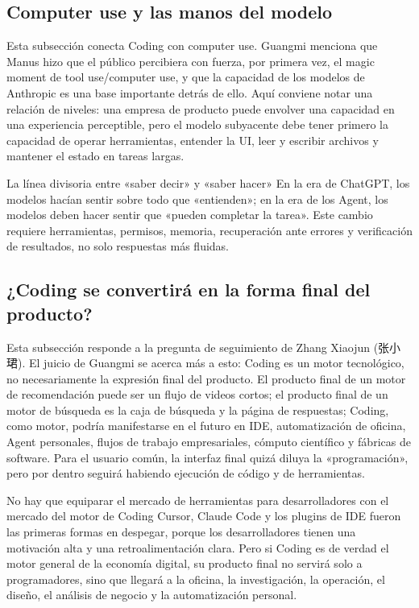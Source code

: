 \documentclass[a4paper]{article}
\begin{document}
\subsection{Computer use y las manos del modelo}

Esta subsección conecta Coding con computer use. Guangmi menciona que Manus hizo que el público percibiera con fuerza, por primera vez, el magic moment de tool use/computer use, y que la capacidad de los modelos de Anthropic es una base importante detrás de ello. Aquí conviene notar una relación de niveles: una empresa de producto puede envolver una capacidad en una experiencia perceptible, pero el modelo subyacente debe tener primero la capacidad de operar herramientas, entender la UI, leer y escribir archivos y mantener el estado en tareas largas.

\begin{importantbox}{La línea divisoria entre «saber decir» y «saber hacer»}
En la era de ChatGPT, los modelos hacían sentir sobre todo que «entienden»; en la era de los Agent, los modelos deben hacer sentir que «pueden completar la tarea». Este cambio requiere herramientas, permisos, memoria, recuperación ante errores y verificación de resultados, no solo respuestas más fluidas.
\end{importantbox}

\subsection{¿Coding se convertirá en la forma final del producto?}

Esta subsección responde a la pregunta de seguimiento de Zhang Xiaojun (张小珺). El juicio de Guangmi se acerca más a esto: Coding es un motor tecnológico, no necesariamente la expresión final del producto. El producto final de un motor de recomendación puede ser un flujo de videos cortos; el producto final de un motor de búsqueda es la caja de búsqueda y la página de respuestas; Coding, como motor, podría manifestarse en el futuro en IDE, automatización de oficina, Agent personales, flujos de trabajo empresariales, cómputo científico y fábricas de software. Para el usuario común, la interfaz final quizá diluya la «programación», pero por dentro seguirá habiendo ejecución de código y de herramientas.

\begin{warningbox}{No hay que equiparar el mercado de herramientas para desarrolladores con el mercado del motor de Coding}
Cursor, Claude Code y los plugins de IDE fueron las primeras formas en despegar, porque los desarrolladores tienen una motivación alta y una retroalimentación clara. Pero si Coding es de verdad el motor general de la economía digital, su producto final no servirá solo a programadores, sino que llegará a la oficina, la investigación, la operación, el diseño, el análisis de negocio y la automatización personal.
\end{warningbox}
\end{document}
